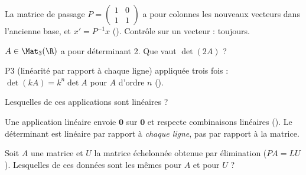 \begin{qcm}
\begin{question}
\begin{explication}
La matrice de passage $P=\begin{pmatrix}1&0\\1&1\end{pmatrix}$ a pour colonnes les nouveaux vecteurs dans l'ancienne base, et $x'=P^{-1}x$ (). Contrôle sur un vecteur : toujours.
\end{explication}
\end{question}
\begin{question}
$A\in\Mat_3(\R)$ a pour déterminant 2. Que vaut $\det(2A)$ ?
\begin{explication}
P3 (linéarité par rapport à chaque ligne) appliquée trois fois : $\det(kA)=k^n\det A$ pour $A$ d'ordre $n$ ().
\end{explication}
\end{question}
\begin{question}[plusieurs]
Lesquelles de ces applications sont linéaires ?
\begin{explication}
Une application linéaire envoie $\mathbf 0$ sur $\mathbf 0$ et respecte combinaisons linéaires (). Le déterminant est linéaire par rapport à \emph{chaque ligne}, pas par rapport à la matrice.
\end{explication}
\end{question}
\begin{question}[plusieurs]
Soit $A$ une matrice et $U$ la matrice échelonnée obtenue par élimination ($PA=LU$). Lesquelles de ces données sont les mêmes pour $A$ et pour $U$ ?

\end{question}
\end{qcm}
